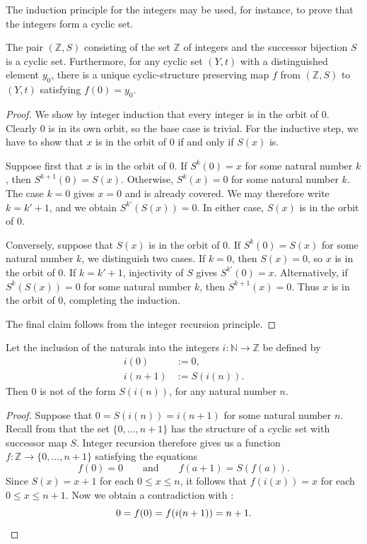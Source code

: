 The induction principle for the integers may be used, for instance, to prove that the integers form a cyclic set.

\begin{theorem}
  The pair $(\mathbb{Z},S)$ consisting of the set $\mathbb{Z}$ of integers and the successor bijection $S$ is a cyclic set. Furthermore, for any cyclic set $(Y,t)$ with a distinguished element $y_0$, there is a unique cyclic-structure preserving map $f$ from $(\mathbb{Z},S)$ to $(Y,t)$ satisfying $f(0)=y_0$.
\end{theorem}

\begin{proof}
  We show by integer induction that every integer is in the orbit of $0$. Clearly $0$ is in its own orbit, so the base case is trivial. For the inductive step, we have to show that $x$ is in the orbit of $0$ if and only if $S(x)$ is.

  Suppose first that $x$ is in the orbit of $0$. If $S^k(0)=x$ for some natural number $k$, then $S^{k+1}(0)=S(x)$. Otherwise, $S^k(x)=0$ for some natural number $k$. The case $k=0$ gives $x=0$ and is already covered. We may therefore write $k=k'+1$, and we obtain $S^{k'}(S(x))=0$. In either case, $S(x)$ is in the orbit of $0$.

  Conversely, suppose that $S(x)$ is in the orbit of $0$. If $S^k(0)=S(x)$ for some natural number $k$, we distinguish two cases. If $k=0$, then $S(x)=0$, so $x$ is in the orbit of $0$. If $k=k'+1$, injectivity of $S$ gives $S^{k'}(0)=x$. Alternatively, if $S^k(S(x))=0$ for some natural number $k$, then $S^{k+1}(x)=0$. Thus $x$ is in the orbit of $0$, completing the induction.

  The final claim follows from the integer recursion principle.
\end{proof}

\begin{theorem}
  Let the inclusion of the naturals into the integers $i:\mathbb{N}\to\mathbb{Z}$ be defined by
  \begin{align*}
    i(0) & := 0, \\
    i(n+1) & := S(i(n)).
  \end{align*}
  Then $0$ is not of the form $S(i(n))$, for any natural number $n$.
\end{theorem}

\begin{proof}
  Suppose that $0=S(i(n))=i(n+1)$ for some natural number $n$. Recall from  that the set $\{0,\ldots,n+1\}$ has the structure of a cyclic set with successor map $S$. Integer recursion therefore gives us a function $f:\mathbb{Z}\to\{0,\ldots,n+1\}$ satisfying the equations
  \begin{equation*}
    f(0)=0 \qquad\text{and}\qquad f(a+1)=S(f(a)).
  \end{equation*}
  Since $S(x)=x+1$ for each $0\leq x\leq n$, it follows that $f(i(x))=x$ for each $0\leq x\leq n+1$. Now we obtain a contradiction with :
  \begin{equation*}
    0=f(0)=f(i(n+1))=n+1. \qedhere
  \end{equation*}
\end{proof}

